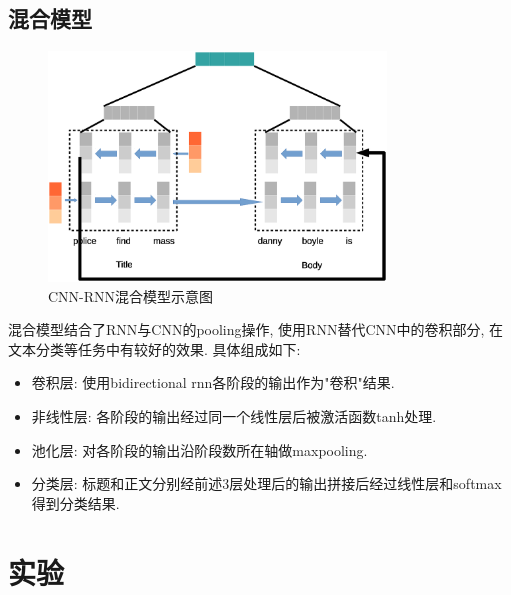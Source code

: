 \documentclass[a4paper]{article}
\begin{document}
	\subsection{混合模型}
	\begin{figure}[H]
		\centering
		\includegraphics[width=0.8\textwidth]{rcnn.eps}
		\caption{CNN-RNN混合模型示意图}
		\label{rcnn}
	\end{figure}
	混合模型结合了RNN与CNN的pooling操作\cite{lai2015recurrent}, 使用RNN替代CNN中的卷积部分, 在文本分类等任务中有较好的效果. 具体组成如下:
	\begin{itemize}
		\item 卷积层: 使用bidirectional rnn各阶段的输出作为"卷积"结果.
		\item 非线性层: 各阶段的输出经过同一个线性层后被激活函数tanh处理.
		\item 池化层: 对各阶段的输出沿阶段数所在轴做maxpooling.
		\item 分类层: 标题和正文分别经前述3层处理后的输出拼接后经过线性层和softmax得到分类结果.
	\end{itemize}
	
	\section{实验}
\end{document}
